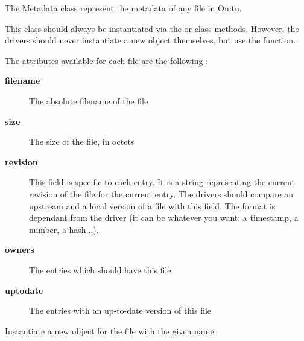 \documentclass[letterpaper,10pt,english]{sphinxmanual}
\begin{document}
\begin{fulllineitems}
\label{drivers:onitu.api.metadata.Metadata}
The Metadata class represent the metadata of any file in Onitu.

This class should always be instantiated via the
{\hyperref[drivers:onitu.api.metadata.Metadata.get_by_id]{}} or {\hyperref[drivers:onitu.api.metadata.Metadata.get_by_filename]{}}
class methods.
However, the drivers should never instantiate a new
{\hyperref[drivers:onitu.api.metadata.Metadata]{}} object themselves, but use the
{\hyperref[drivers:onitu.api.Plug.get_metadata]{}} function.

The attributes available for each file are the following :
\begin{description}
\item[{\textbf{filename}}] \leavevmode
The absolute filename of the file

\item[{\textbf{size}}] \leavevmode
The size of the file, in octets

\item[{\textbf{revision}}] \leavevmode
This field is specific to each entry. It is a string
representing the current revision of the file for the
current entry.
The drivers should compare an upstream and a local version
of a file with this field. The format is dependant from the
driver (it can be whatever you want: a timestamp, a number,
a hash...).

\item[{\textbf{owners}}] \leavevmode
The entries which should have this file

\item[{\textbf{uptodate}}] \leavevmode
The entries with an up-to-date version of this file

\end{description}

\begin{fulllineitems}
\label{drivers:onitu.api.metadata.Metadata.get_by_filename}
Instantiate a new {\hyperref[drivers:onitu.api.metadata.Metadata]{}} object for the file
with the given name.


\end{fulllineitems}
\end{fulllineitems}
\end{document}
